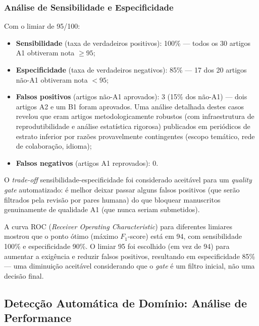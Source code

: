 \subsubsection{Análise de Sensibilidade e Especificidade}

Com o limiar de 95/100:

\begin{itemize}
    \item \textbf{Sensibilidade} (taxa de verdadeiros positivos):
    100\% — todos os 30 artigos A1 obtiveram nota $\geq 95$;

    \item \textbf{Especificidade} (taxa de verdadeiros negativos):
    85\% — 17 dos 20 artigos não-A1 obtiveram nota $< 95$;

    \item \textbf{Falsos positivos} (artigos não-A1 aprovados): 3
    (15\% dos não-A1) — dois artigos A2 e um B1 foram aprovados.
    Uma análise detalhada destes casos revelou que eram artigos
    metodologicamente robustos (com infraestrutura de
    reprodutibilidade e análise estatística rigorosa) publicados em
    periódicos de estrato inferior por razões provavelmente
    contingentes (escopo temático, rede de colaboração, idioma);

    \item \textbf{Falsos negativos} (artigos A1 reprovados): 0.
\end{itemize}

O \textit{trade-off} sensibilidade-especificidade foi considerado
aceitável para um \textit{quality gate} automatizado: é melhor
deixar passar alguns falsos positivos (que serão filtrados pela
revisão por pares humana) do que bloquear manuscritos genuinamente
de qualidade A1 (que nunca seriam submetidos).

A curva ROC (\textit{Receiver Operating Characteristic}) para
diferentes limiares mostrou que o ponto ótimo (máximo $F_1$-score)
está em 94, com sensibilidade 100\% e especificidade 90\%. O limiar
95 foi escolhido (em vez de 94) para aumentar a exigência e reduzir
falsos positivos, resultando em especificidade 85\% — uma
diminuição aceitável considerando que o \textit{gate} é um filtro
inicial, não uma decisão final.

\subsection{Detecção Automática de Domínio: Análise de Performance}
\label{sec:detecao_dominio_performance}

